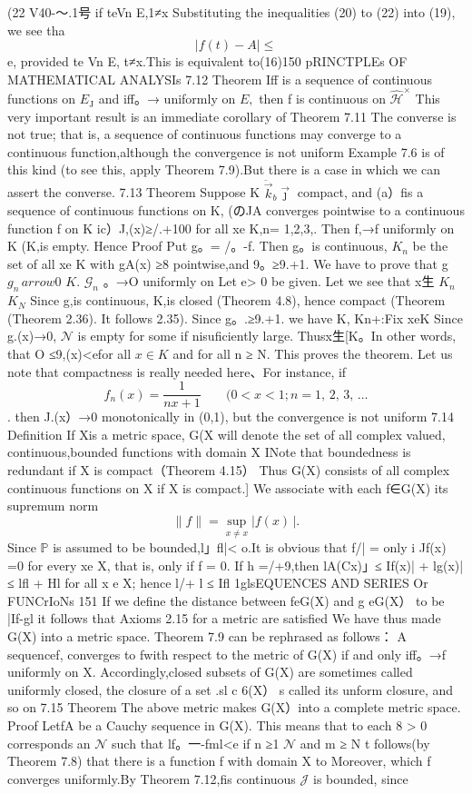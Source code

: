 (22 V40-～.1号 if teVn E,1≠x Substituting the inequalities (20) to (22) into (19), we see tha $$ |f(t)-A|\leq $$ e, provided te Vn E, t≠x.This is equivalent to(16)150 pRINCTPLEs OF MATHEMATICAL ANALYSIs 7.12 Theorem If{f} is a sequence of continuous functions on $\textstyle E_{\mathrm{{J}}}$ and iff。→ uniformly on $\textstyle E,$ then f is continuous on ${\widehat{\mathcal{H}}}^{\times}$ This very important result is an immediate corollary of Theorem 7.11 The converse is not true; that is, a sequence of continuous functions may converge to a continuous function,although the convergence is not uniform Example 7.6 is of this kind (to see this, apply Theorem 7.9).But there is a case in which we can assert the converse. 7.13 Theorem Suppose K ${\ddot{\vec{k}}}_{b}\vec{\jmath}$ compact, and (a）{f}is a sequence of continuous functions on K, (のJA converges pointwise to a continuous function f on K ic）J,(x)≥/.+100 for all xe K,n= 1,2,3,. Then f,→f uniformly on K (K,is empty. Hence Proof Put g。= /。-f. Then g。is continuous, $K_{n}$ be the set of all xe K with gA(x) ≥8 pointwise,and 9。≥9.+1. We have to prove that g $\scriptstyle g_{n}\, arrow0$ $K.$ ${\mathcal{G}}_{n}$ 。→O uniformly on Let e> 0 be given. Let we see that x生 $K_{n}$ $K_{N}$ Since g,is continuous, K,is closed (Theorem 4.8), hence compact (Theorem (Theorem 2.36). It follows 2.35). Since g。.≥9.+1. we have K, Kn+:Fix xeK Since g.(x)→0, $\mathcal{N}$ is empty for some if nisuficiently large. Thusx生[K。In other words, that O ≤9,(x)<efor all $x\in K$ and for all n ≥ N. This proves the theorem. Let us note that compactness is really needed here、For instance, if $$ f_{n}(x)=\frac{1}{n x+1}\;\;\;\;\;\;\;(0<x<1;n=1,\,2,\,3,\,\ldots $$ . then J.(x）→0 monotonically in (0,1), but the convergence is not uniform 7.14 Definition If Xis a metric space, G(X will denote the set of all complex valued, continuous,bounded functions with domain X INote that boundedness is redundant if X is compact（Theorem 4.15） Thus G(X) consists of all complex continuous functions on X if X is compact.] We associate with each f∈G(X) its supremum norm $$ \|f\|=\operatorname*{sup}_{x\neq x}|f(x)\,|. $$ Since $\mathbb{P}$ is assumed to be bounded,l」fl|< o.It is obvious that f/| = only i Jf(x) =0 for every xe X, that is, only if f = 0. If h =/+9,then lA(Cx)」≤ If(x)| + lg(x)| ≤ lfl + Hl for all x e X; hence l/+ l ≤ Ifl 1glsEQUENCES AND SERIES Or FUNCrIoNs 151 If we define the distance between feG(X) and g eG(X） to be |If-gl it follows that Axioms 2.15 for a metric are satisfied We have thus made G(X) into a metric space. Theorem 7.9 can be rephrased as follows： A sequence{f,} converges to fwith respect to the metric of G(X) if and only iff。→f uniformly on X. Accordingly,closed subsets of G(X) are sometimes called uniformly closed, the closure of a set .sl c 6(X） s called its unform closure, and so on 7.15 Theorem The above metric makes G(X）into a complete metric space. Proof Let{fA} be a Cauchy sequence in G(X). This means that to each 8 > 0 corresponds an $\mathcal{N}$ such that lf。一-fml<e if n ≥1 $\mathcal{N}$ and m ≥ N t follows(by Theorem 7.8) that there is a function f with domain X to Moreover, which {f} converges uniformly.By Theorem 7.12,fis continuous $\mathsf{\mathcal{J}}$ is bounded, since 